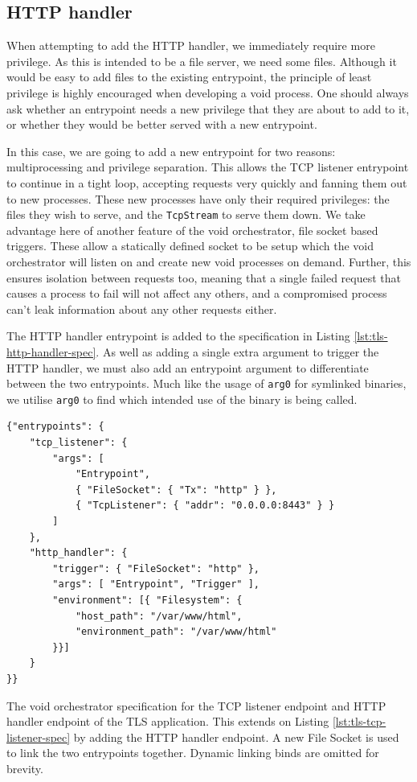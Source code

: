 \documentclass[12pt,a4paper,twoside]{report}
\begin{document}
\subsection{HTTP handler}
\label{sec:building-tls-http-handler}

When attempting to add the HTTP handler, we immediately require more privilege. As this is intended to be a file server, we need some files. Although it would be easy to add files to the existing entrypoint, the principle of least privilege is highly encouraged when developing a void process. One should always ask whether an entrypoint needs a new privilege that they are about to add to it, or whether they would be better served with a new entrypoint.

In this case, we are going to add a new entrypoint for two reasons: multiprocessing and privilege separation. This allows the TCP listener entrypoint to continue in a tight loop, accepting requests very quickly and fanning them out to new processes. These new processes have only their required privileges: the files they wish to serve, and the \texttt{TcpStream} to serve them down. We take advantage here of another feature of the void orchestrator, file socket based triggers. These allow a statically defined socket to be setup which the void orchestrator will listen on and create new void processes on demand. Further, this ensures isolation between requests too, meaning that a single failed request that causes a process to fail will not affect any others, and a compromised process can't leak information about any other requests either.

The HTTP handler entrypoint is added to the specification in Listing \ref{lst:tls-http-handler-spec}. As well as adding a single extra argument to trigger the HTTP handler, we must also add an entrypoint argument to differentiate between the two entrypoints. Much like the usage of \texttt{arg0} for symlinked binaries, we utilise \texttt{arg0} to find which intended use of the binary is being called.

\begin{listing}
\begin{verbatim}
{"entrypoints": {
    "tcp_listener": {
        "args": [
            "Entrypoint",
            { "FileSocket": { "Tx": "http" } },
            { "TcpListener": { "addr": "0.0.0.0:8443" } }
        ]
    },
    "http_handler": {
        "trigger": { "FileSocket": "http" },
        "args": [ "Entrypoint", "Trigger" ],
        "environment": [{ "Filesystem": {
            "host_path": "/var/www/html",
            "environment_path": "/var/www/html"
        }}]
    }
}}
\end{verbatim}

\caption{The void orchestrator specification for the TCP listener endpoint and HTTP handler endpoint of the TLS application. This extends on Listing \ref{lst:tls-tcp-listener-spec} by adding the HTTP handler endpoint. A new File Socket is used to link the two entrypoints together. Dynamic linking binds are omitted for brevity.}
\label{lst:tls-http-handler-spec}
\end{listing}
\end{document}
